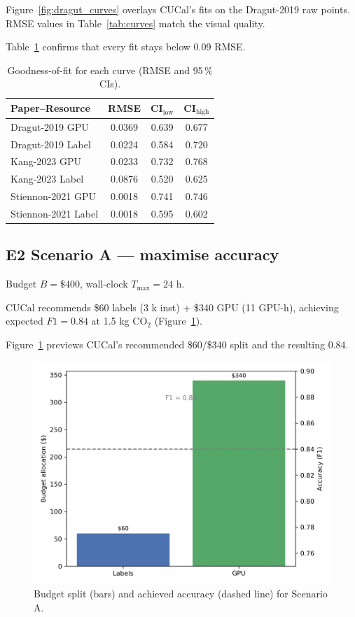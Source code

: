 \documentclass[11pt]{article}
\begin{document}
Figure~\ref{fig:dragut_curves} overlays CUCal’s fits on the
Dragut-2019 raw points.  RMSE values in Table~\ref{tab:curves}
match the visual quality.

Table~\ref{tab:rmse} confirms that every fit stays below 0.09 RMSE.

\begin{table}[ht]
  \centering
  \caption{Goodness-of-fit for each curve (RMSE and 95\,\% CIs).}
  \label{tab:rmse}             %
  \begin{tabular}{lccc}
    \toprule
    Paper–Resource            & RMSE  & CI$_\text{low}$ & CI$_\text{high}$ \\
    \midrule
    Dragut-2019 GPU           & 0.0369 & 0.639 & 0.677 \\
    Dragut-2019 Label         & 0.0224 & 0.584 & 0.720 \\
    Kang-2023 GPU             & 0.0233 & 0.732 & 0.768 \\
    Kang-2023 Label           & 0.0876 & 0.520 & 0.625 \\
    Stiennon-2021 GPU         & 0.0018 & 0.741 & 0.746 \\
    Stiennon-2021 Label       & 0.0018 & 0.595 & 0.602 \\
    \bottomrule
  \end{tabular}
\end{table}


\subsection{E2 Scenario A — maximise accuracy}
Budget \(B=\$400\), wall-clock \(T_{\max}=24\) h.

CUCal recommends \$60 labels (3 k inst) + \$340 GPU (11 GPU-h),
achieving expected \(F1=0.84\) at 1.5 kg CO\(_2\)
(Figure~\ref{fig:scenarioA}).

Figure~\ref{fig:scenarioA} previews CUCal’s recommended \$60/\$340 split
and the resulting \SI{0.84}{\fOneScore}.

\begin{figure}[htbp]
  \centering
  \includegraphics[width=.75\linewidth]{figures/scenarioA.png}
  \caption{Budget split (bars) and achieved accuracy (dashed line) for Scenario A.}
  \label{fig:scenarioA}
\end{figure}
\end{document}
